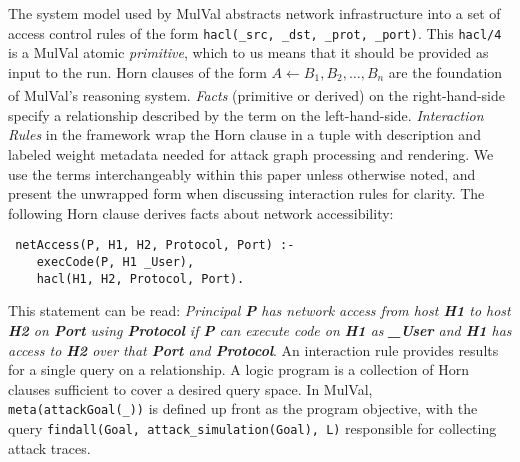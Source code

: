 
% 

% 

% 


The system model used by MulVal abstracts network infrastructure into a set of access control rules of the form \verb|hacl(_src, _dst, _prot, _port)|. This \verb|hacl/4| is a MulVal atomic \textit{primitive}, which to us means that it should be provided as input to the run. Horn clauses\cite{Chandra_Harel_1985} of the form $A\xleftarrow[]{} B_1, B_2,\dots, B_n $ are the foundation of MulVal's reasoning system. \textit{Facts} (primitive or derived) on the right-hand-side specify a relationship described by the term on the left-hand-side. \textit{Interaction Rules} in the framework wrap the Horn clause in a tuple with description and labeled weight metadata needed for attack graph processing and rendering. We use the terms interchangeably within this paper unless otherwise noted, and present the unwrapped form when discussing interaction rules for clarity.  The following Horn clause derives facts about network accessibility:
 \begin{verbatim}
 netAccess(P, H1, H2, Protocol, Port) :- 
    execCode(P, H1 _User),
    hacl(H1, H2, Protocol, Port).
 \end{verbatim}
This statement can be read: \textit{Principal \textbf{P} has network access from host \textbf{H1} to host \textbf{H2} on \textbf{Port} using \textbf{Protocol} if \textbf{P} can execute code on \textbf{H1} as \textbf{\_User} and \textbf{H1} has access to \textbf{H2} over that \textbf{Port} and \textbf{Protocol}}. An interaction rule provides results for a single query on a relationship. A logic program is a collection of Horn clauses sufficient to cover a desired query space. In MulVal, \verb|meta(attackGoal(_))| is defined up front as the program objective, with the query \verb|findall(Goal, attack_simulation(Goal), L)| responsible for collecting attack traces. 


